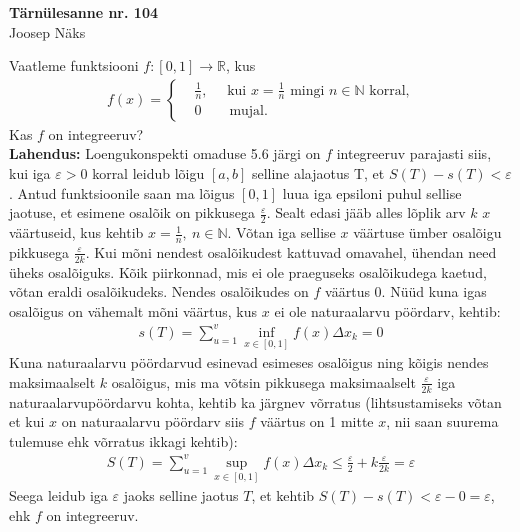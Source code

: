\documentclass{article}
\begin{document}
\begin{center}
\Large\textbf{T\"arn\"ulesanne nr. 104}\\
\small{Joosep N\"aks}
\end{center}
Vaatleme funktsiooni $f:[0,1]\to\mathbb{R}$, kus
\begin{gather*}
f(x)=\left\{
\begin{aligned}
&\frac{1}{n},\quad\text{ kui }x=\frac{1}{n}\text{ mingi }n\in\mathbb{N}\text{ korral,}\\
&0\qquad\text{mujal.}
\end{aligned}
\right.
\end{gather*}
Kas $f$ on integreeruv?\\
\textbf{Lahendus:} Loengukonspekti omaduse 5.6 j\"argi on $f$ integreeruv parajasti siis, kui iga $\varepsilon>0$ korral leidub l\~oigu $[a,b]$ selline alajaotus T, et $S(T)-s(T)<\varepsilon$. Antud funktsioonile saan ma l\~oigus $[0,1]$ luua iga epsiloni puhul sellise jaotuse, et esimene osal\~oik on pikkusega $\frac{\varepsilon}{2}$. Sealt edasi j\"a\"ab alles l\~oplik arv $k$ $x$ v\"a\"artuseid, kus kehtib $x=\frac{1}{n},\ n\in\mathbb{N}$. V\~otan iga sellise $x$ v\"a\"artuse \"umber osal\~oigu pikkusega $\frac{\varepsilon}{2k}$. Kui m\~oni nendest osal\~oikudest kattuvad omavahel, \"uhendan need \"uheks osal\~oiguks. K\~oik piirkonnad, mis ei ole praeguseks osal\~oikudega kaetud, v\~otan eraldi osal\~oikudeks. Nendes osal\~oikudes on $f$ v\"a\"artus 0. N\"u\"ud kuna igas osal\~oigus on v\"ahemalt m\~oni v\"a\"artus, kus $x$ ei ole naturaalarvu p\"o\"ordarv, kehtib:
\begin{gather*}
s(T)=\sum_{u=1}^v \inf_{x\in[0,1]}f(x) \Delta x_k=0
\end{gather*}
Kuna naturaalarvu p\"o\"ordarvud esinevad esimeses osal\~oigus ning k\~oigis nendes maksimaalselt $k$ osal\~oigus, mis ma v\~otsin pikkusega maksimaalselt $\frac{\varepsilon}{2k}$ iga naturaalarvup\"o\"ordarvu kohta, kehtib ka j\"argnev v\~orratus (lihtsustamiseks v\~otan et kui $x$ on naturaalarvu p\"o\"ordarv siis $f$ v\"a\"artus on 1 mitte $x$, nii saan suurema tulemuse ehk v\~orratus ikkagi kehtib):
\begin{gather*}
S(T)=\sum_{u=1}^v \sup_{x\in[0,1]}f(x) \Delta x_k\leq\frac{\varepsilon}{2}+k\frac{\varepsilon}{2k}=\varepsilon
\end{gather*}
Seega leidub iga $\varepsilon$ jaoks selline jaotus $T$, et kehtib $S(T)-s(T)<\varepsilon-0=\varepsilon$, ehk $f$ on integreeruv.
\end{document}
